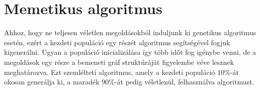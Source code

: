 \section{Memetikus algoritmus}\label{sec:MEMETIKUS_ALGORITMUS}

Ahhoz, hogy ne teljesen véletlen megoldásokból induljunk ki  genetikus algoritmus esetén,
ezért a kezdeti populáció egy részét  algoritmus segítségével fogjuk kigenerálni.
Ugyan a populáció inicializálása így több időt fog igénybe venni,
de a megoldások egy része a bemeneti gráf struktúráját figyelembe véve lesznek meghatározva.
Ezt szemlélteti  algoritmus, amely a kezdeti populáció $10\%$-át okosan generálja ki,
a maradék $90\%$-át pedig véletlenül, felhasználva  algoritmust.

